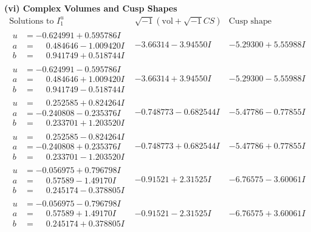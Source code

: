 \documentclass[1p]{elsarticle_modified}
\theoremstyle{definition}
\newcommand{\I}{\sqrt{-1}}
\begin{document}
\newpage\flushleft \textbf{(vi) Complex Volumes and Cusp Shapes}
$$\begin{array}{c|c|c}  
\text{Solutions to }I^u_{1}& \I (\text{vol} + \sqrt{-1}CS) & \text{Cusp shape}\\
 \hline 
\begin{aligned}
u &= -0.624991 + 0.595786 I \\
a &= \phantom{-}0.484646 - 1.009420 I \\
b &= \phantom{-}0.941749 + 0.518744 I\end{aligned}
 & -3.66314 - 3.94550 I & -5.29300 + 5.55988 I \\ \hline\begin{aligned}
u &= -0.624991 - 0.595786 I \\
a &= \phantom{-}0.484646 + 1.009420 I \\
b &= \phantom{-}0.941749 - 0.518744 I\end{aligned}
 & -3.66314 + 3.94550 I & -5.29300 - 5.55988 I \\ \hline\begin{aligned}
u &= \phantom{-}0.252585 + 0.824264 I \\
a &= -0.240808 - 0.235376 I \\
b &= \phantom{-}0.233701 + 1.203520 I\end{aligned}
 & -0.748773 - 0.682544 I & -5.47786 - 0.77855 I \\ \hline\begin{aligned}
u &= \phantom{-}0.252585 - 0.824264 I \\
a &= -0.240808 + 0.235376 I \\
b &= \phantom{-}0.233701 - 1.203520 I\end{aligned}
 & -0.748773 + 0.682544 I & -5.47786 + 0.77855 I \\ \hline\begin{aligned}
u &= -0.056975 + 0.796798 I \\
a &= \phantom{-}0.57589 - 1.49170 I \\
b &= \phantom{-}0.245174 - 0.378805 I\end{aligned}
 & -0.91521 + 2.31525 I & -6.76575 - 3.60061 I \\ \hline\begin{aligned}
u &= -0.056975 - 0.796798 I \\
a &= \phantom{-}0.57589 + 1.49170 I \\
b &= \phantom{-}0.245174 + 0.378805 I\end{aligned}
 & -0.91521 - 2.31525 I & -6.76575 + 3.60061 I \\ \hline\begin{aligned}

\end{aligned}
\end{array}$$
\end{document}
